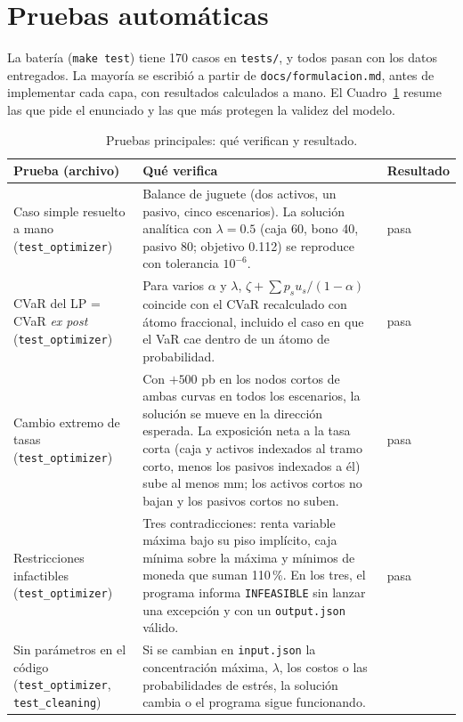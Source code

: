 \section{Pruebas automáticas}\label{app:pruebas}
La batería (\texttt{make test}) tiene 170 casos en \texttt{tests/}, y todos pasan con los datos entregados.
La mayoría se escribió a partir de \texttt{docs/formulacion.md}, antes de implementar cada capa, con
resultados calculados a mano. El Cuadro~\ref{tab:pruebas} resume las que pide el enunciado y las que más
protegen la validez del modelo.

\begin{table}[htbp]
\centering\small
\caption{Pruebas principales: qué verifican y resultado.}\label{tab:pruebas}
\begin{tabular}{p{}p{}l}
\toprule
Prueba (archivo) & Qué verifica & Resultado \\
\midrule
Caso simple resuelto a mano (\texttt{test\_optimizer})
  & Balance de juguete (dos activos, un pasivo, cinco escenarios). La solución analítica con $\lambda=0.5$
    (caja 60, bono 40, pasivo 80; objetivo 0.112) se reproduce con tolerancia $10^{-6}$.
  & pasa \\
CVaR del LP = CVaR \emph{ex post} (\texttt{test\_optimizer})
  & Para varios $\alpha$ y $\lambda$, $\zeta+\sum p_s u_s/(1-\alpha)$ coincide con el CVaR recalculado con
    átomo fraccional, incluido el caso en que el VaR cae dentro de un átomo de probabilidad.
  & pasa \\
Cambio extremo de tasas (\texttt{test\_optimizer})
  & Con $+500$ pb en los nodos cortos de ambas curvas en todos los escenarios, la solución se mueve en la
    dirección esperada. La exposición neta a la tasa corta (caja y activos indexados al tramo corto, menos
    los pasivos indexados a él) sube al menos \PEN1 mm; los activos cortos no bajan y los pasivos cortos no
    suben.
  & pasa \\
Restricciones infactibles (\texttt{test\_optimizer})
  & Tres contradicciones: renta variable máxima bajo su piso implícito, caja mínima sobre la máxima y
    mínimos de moneda que suman 110\,\%. En los tres, el programa informa \texttt{INFEASIBLE} sin lanzar una
    excepción y con un \texttt{output.json} válido.
  & pasa \\
Sin parámetros en el código (\texttt{test\_optimizer}, \texttt{test\_cleaning})
  & Si se cambian en \texttt{input.json} la concentración máxima, $\lambda$, los costos o las
    probabilidades de estrés, la solución cambia o el programa sigue funcionando.

\end{tabular}
\end{table}
